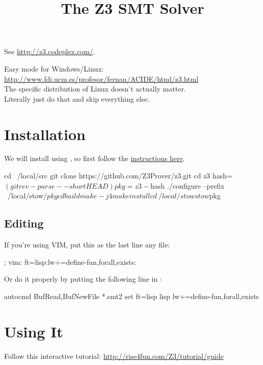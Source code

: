 
\title{The Z3 SMT Solver}
\date{}



See \url{http://z3.codeplex.com/}.

Easy mode for Windows/Linux: \url{http://www.fdi.ucm.es/profesor/fernan/ACIDE/html/z3.html}\\
The specific distribution of Linux doesn't actually matter.\\
Literally just do that and skip everything else.

\section{Installation}

We will install  using , so first follow the \href{install.html}{instructions here}.
\begin{code}
cd ~/local/src
git clone https://github.com/Z3Prover/z3.git
cd z3
hash=$(git rev-parse --short HEAD)
pkg=z3-${hash}
./configure --prefix ~/local/stow/$pkg
cd build
make -j4
make install
cd ~/local/stow
stow $pkg
\end{code}

\subsection{Editing}

If you're using VIM, put this as the last line any file:
\begin{code}
; vim: ft=lisp:lw+=define-fun,forall,exists:
\end{code}
Or do it properly by putting the following line in :
\begin{code}
autocmd BufRead,BufNewFile *.smt2 set ft=lisp lisp lw+=define-fun,forall,exists
\end{code}

\section{Using It}

Follow this interactive tutorial: \url{http://rise4fun.com/Z3/tutorial/guide}



